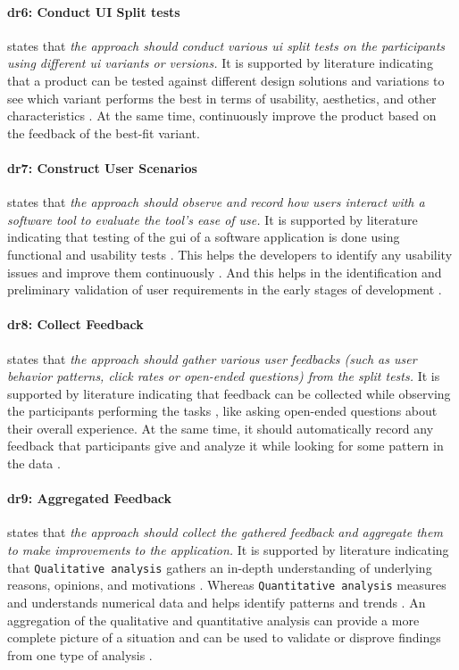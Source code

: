\paragraph*{\ac{dr}6: Conduct UI Split tests} states that \textit{the approach should conduct various \ac{ui} split tests on the participants using different \ac{ui} variants or versions.}
It is supported by literature indicating that a product can be tested against different design solutions and variations \cite{article:CE:fitzgerald} to see which variant performs the best in terms of usability, aesthetics, and other characteristics \cite{article:controlled:experiements}. 
At the same time, continuously improve \cite{article:CE:ros} the product based on the feedback of the best-fit variant.

\paragraph{\ac{dr}7: Construct User Scenarios} states that \textit{the approach should observe and record how users interact with a software tool to evaluate the tool's ease of use.} 
It is supported by literature indicating that testing of the \ac{gui} of a software application is done using functional and usability tests \cite{misc:usability:tasks}. 
This helps the developers to identify any usability issues \cite{article:tbup:kari} and improve them continuously \cite{article:prototyping:gould}.
And this helps in the identification and preliminary validation of user requirements in the early stages of development \cite{article:prototyping:weichbroth}. 


\paragraph{\ac{dr}8: Collect Feedback} states that \textit{the approach should gather various user feedbacks (such as user behavior patterns, click rates or open-ended questions) from the split tests.}
It is supported by literature indicating that feedback can be collected while observing the participants performing the tasks \cite{misc:qualitative:qualitative}, like asking open-ended questions about their overall experience.
At the same time, it should automatically record any feedback that participants give and analyze it while looking for some pattern in the data \cite{article:qqa:young}.

\paragraph{\ac{dr}9: Aggregated Feedback} states that \textit{the approach should collect the gathered feedback and aggregate them to make improvements to the application.} 
It is supported by literature indicating that \texttt{Qualitative analysis} gathers an in-depth understanding of underlying reasons, opinions, and motivations \cite{misc:dsr:mayring}.
Whereas \texttt{Quantitative analysis} measures and understands numerical data and helps identify patterns and trends \cite{article:qqa:young}.
An aggregation of the qualitative and quantitative analysis can provide a more complete picture of a situation and can be used to validate or disprove findings from one type of analysis \cite{article:qq:helena}.

